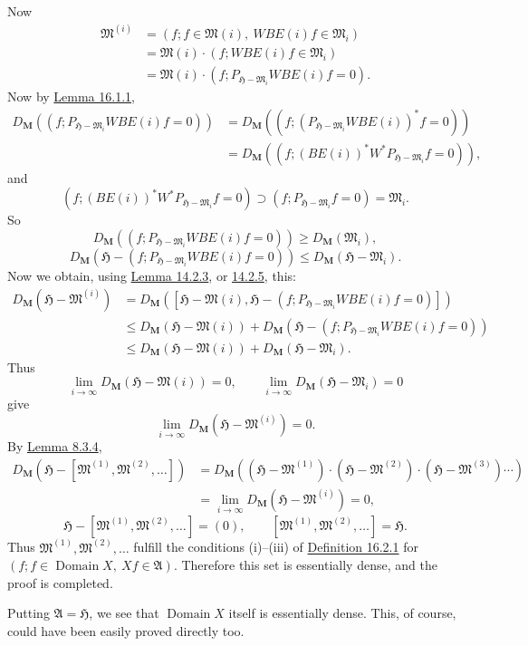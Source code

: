\documentclass[12pt,b5paper,twoside]{article}
\newcommand{\Hspace}{\mathfrak H}
\newcommand{\M}{\mathbf M}
\newcommand{\defref}[1]{\hyperref[def:#1]{Definition #1}}
\newcommand{\lemref}[1]{\hyperref[lem:#1]{Lemma #1}}
\begin{document}
Now
\[
\begin{aligned}
\mathfrak M^{(i)}
 &=(f;f\in\mathfrak M(i),\ WBE(i)f\in\mathfrak M_i)\\
 &=\mathfrak M(i)\cdot(f;WBE(i)f\in\mathfrak M_i)\\
 &=\mathfrak M(i)\cdot
   (f;P_{\Hspace-\mathfrak M_i}WBE(i)f=0).
\end{aligned}
\]
Now by \lemref{16.1.1},
\[
\begin{aligned}
D_{\M}((f;P_{\Hspace-\mathfrak M_i}WBE(i)f=0))
 &=D_{\M}((f;(P_{\Hspace-\mathfrak M_i}WBE(i))^*f=0))\\
 &=D_{\M}((f;(BE(i))^*W^*P_{\Hspace-\mathfrak M_i}f=0)),
\end{aligned}
\]
and
\[
(f;(BE(i))^*W^*P_{\Hspace-\mathfrak M_i}f=0)
\supset(f;P_{\Hspace-\mathfrak M_i}f=0)=\mathfrak M_i.
\]
So
\[
D_{\M}((f;P_{\Hspace-\mathfrak M_i}WBE(i)f=0))
\geq D_{\M}(\mathfrak M_i),
\]
\[
D_{\M}(\Hspace-(f;P_{\Hspace-\mathfrak M_i}WBE(i)f=0))
\leq D_{\M}(\Hspace-\mathfrak M_i).
\]
Now we obtain, using \lemref{14.2.3}, or
\hyperref[lem:14.2.5]{14.2.5}, this:
\[
\begin{aligned}
D_{\M}(\Hspace-\mathfrak M^{(i)})
 &=D_{\M}([\Hspace-\mathfrak M(i),
   \Hspace-(f;P_{\Hspace-\mathfrak M_i}WBE(i)f=0)])\\
 &\leq D_{\M}(\Hspace-\mathfrak M(i))
 +D_{\M}(\Hspace-(f;P_{\Hspace-\mathfrak M_i}WBE(i)f=0))\\
 &\leq D_{\M}(\Hspace-\mathfrak M(i))
 +D_{\M}(\Hspace-\mathfrak M_i).
\end{aligned}
\]
Thus
\[
\lim_{i\to\infty}D_{\M}(\Hspace-\mathfrak M(i))=0,
\qquad
\lim_{i\to\infty}D_{\M}(\Hspace-\mathfrak M_i)=0
\]
give
\[
\lim_{i\to\infty}D_{\M}(\Hspace-\mathfrak M^{(i)})=0.
\]
By \lemref{8.3.4},
\[
\begin{aligned}
D_{\M}(\Hspace-[\mathfrak M^{(1)},\mathfrak M^{(2)},\ldots])
 &=D_{\M}((\Hspace-\mathfrak M^{(1)})
          \cdot(\Hspace-\mathfrak M^{(2)})
          \cdot(\Hspace-\mathfrak M^{(3)})\cdots)\\
 &=\lim_{i\to\infty}D_{\M}(\Hspace-\mathfrak M^{(i)})=0,
\end{aligned}
\]
\[
\Hspace-[\mathfrak M^{(1)},\mathfrak M^{(2)},\ldots]=(0),
\qquad
[\mathfrak M^{(1)},\mathfrak M^{(2)},\ldots]=\Hspace.
\]
Thus \(\mathfrak M^{(1)},\mathfrak M^{(2)},\ldots\) fulfill the conditions
(i)--(iii) of \defref{16.2.1} for
\((f;f\in\operatorname{Domain}X,\ Xf\in\mathfrak A)\). Therefore this set
is essentially dense, and the proof is completed.

Putting \(\mathfrak A=\Hspace\), we see that \(\operatorname{Domain}X\)
itself is essentially dense. This, of course, could have been easily proved
directly too.
\end{document}
